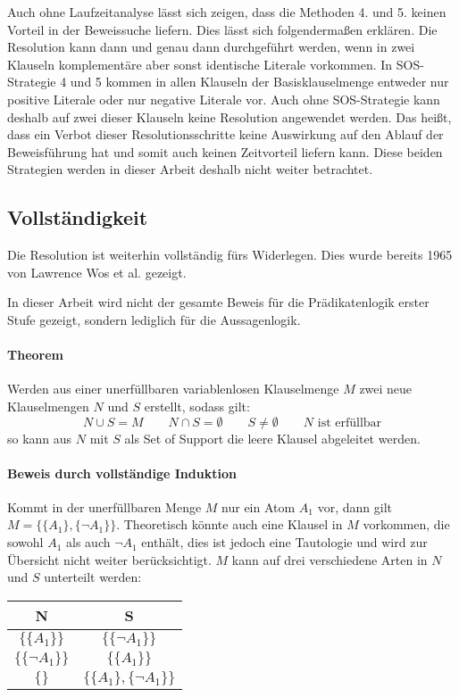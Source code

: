 Auch ohne Laufzeitanalyse lässt sich zeigen, dass die Methoden 4. und 5. keinen Vorteil in der Beweissuche liefern. Dies lässt sich folgendermaßen erklären. Die Resolution kann dann und genau dann durchgeführt werden, wenn in zwei Klauseln komplementäre aber sonst identische Literale vorkommen. In SOS-Strategie 4 und 5 kommen in allen Klauseln der Basisklauselmenge entweder nur positive Literale oder nur negative Literale vor. Auch ohne SOS-Strategie kann deshalb auf zwei dieser Klauseln keine Resolution angewendet werden. Das heißt, dass ein Verbot dieser Resolutionsschritte keine Auswirkung auf den Ablauf der Beweisführung hat und somit auch keinen Zeitvorteil liefern kann. Diese beiden Strategien werden in dieser Arbeit deshalb nicht weiter betrachtet.

		\subsection{Vollständigkeit}		
Die Resolution ist weiterhin vollständig fürs Widerlegen. Dies wurde bereits 1965 von Lawrence Wos et al. gezeigt.\cite{Wos1965Sos}

In dieser Arbeit wird nicht der gesamte Beweis für die Prädikatenlogik erster Stufe gezeigt, sondern lediglich für die Aussagenlogik. 

\paragraph{Theorem} Werden aus einer unerfüllbaren variablenlosen Klauselmenge $M$ zwei neue Klauselmengen $N$ und $S$ erstellt, sodass gilt: 
$$N \cup S = M \quad\quad N \cap S = \emptyset \quad\quad S \neq \emptyset \quad\quad N \text{ ist erfüllbar}$$
so kann aus $N$ mit $S$ als Set of Support die leere Klausel abgeleitet werden.

\paragraph{Beweis durch vollständige Induktion}
Kommt in der unerfüllbaren Menge $M$ nur ein Atom $A_1$ vor, dann gilt
$M=\big\{\{A_1\}, \{\neg A_1\}\big\}$. Theoretisch könnte auch eine Klausel in $M$ vorkommen, die sowohl $A_1$ als auch $\neg A_1$ enthält, dies ist jedoch eine Tautologie und wird zur Übersicht nicht weiter berücksichtigt. $M$ kann auf drei verschiedene Arten in $N$ und $S$ unterteilt werden:
\begin{table}[h]
	\centering
	\begin{tabular}{c|c}
		N & S \\ \hline
		$\big\{\{A_1\}\big\}$ & $\big\{\{\neg A_1\}\big\}$ \\
		$\big\{\{\neg A_1\}\big\}$ & $\big\{\{A_1\}\big\}$ \\	
		$\big\{\big\}$ & $\big\{\{A_1\},\{\neg A_1\}\big\}$
	\end{tabular}
\end{table}


